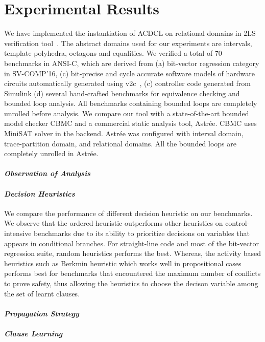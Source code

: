 \section{Experimental Results}
We have implemented the instantiation of ACDCL on relational domains 
in 2LS verification tool~\cite{2ls}.  The abstract domains used for 
our experiments are intervals, template polyhedra, octagons and equalities.  
We verified a total of 70 benchmarks in ANSI-C, which are derived from 
(a) bit-vector regression category in SV-COMP'16, (c) bit-precise and 
cycle accurate software models of hardware circuits automatically 
generated using v2c~\cite{mtk2016}, (c) controller code generated 
from Simulink (d) several hand-crafted benchmarks for equivalence 
checking and bounded loop analysis.  All benchmarks containing 
bounded loops are completely unrolled before analysis.  We compare 
our tool with a state-of-the-art bounded model checker CBMC and a 
commercial static analysis tool, Astr{\'e}e.  CBMC uses MiniSAT 
solver in the backend.  Astr{\'e}e was configured with interval 
domain, trace-partition domain, and relational domains.  All the 
bounded loops are completely unrolled in Astr{\'e}e.   

\paragraph {\em Observation of Analysis}

\paragraph {\em \textbf{Decision Heuristics}} We compare the performance of 
different decision heuristic on our benchmarks.  We observe that 
the ordered heuristic outperforms other heuristics on control-intensive 
benchmarks due to its ability to prioritize decisions on variables that 
appears in conditional branches.  For straight-line code and most of 
the bit-vector regression suite, random heuristics performs the best.  
Whereas, the activity based heuristics such as Berkmin heuristic which 
works well in propositional cases performs best for benchmarks that 
encountered the maximum number of conflicts to prove safety, thus allowing 
the heuristics to choose the decison variable among the set of learnt clauses.   

\paragraph {\em \textbf{Propagation Strategy}}      

\paragraph {\em \textbf{Clause Learning}}      

  
